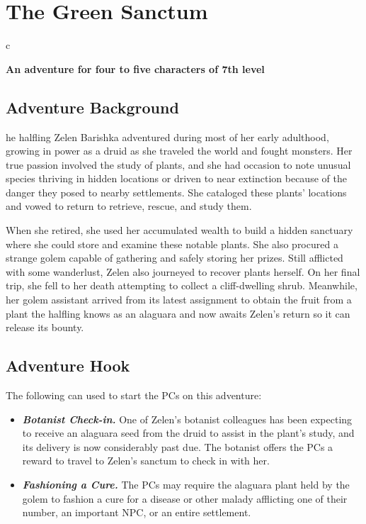 \documentclass[10pt,a4paper,twoside,bg=print,twocolumn,openany,nodeprecatedcode]{dndbook}
\begin{document}
\chapter{The Green Sanctum}

\begin{DndTable}{c}

\textbf{An adventure for four to five characters of 7th level}\\
\end{DndTable}

\section{Adventure Background}
he halfling Zelen Barishka adventured during most of her early adulthood, growing in power as a druid as she traveled the world and fought monsters. Her true passion involved the study of plants, and she had occasion to note unusual species thriving in hidden locations or driven to near extinction because of the danger they posed to nearby settlements. She cataloged these plants' locations and vowed to return to retrieve, rescue, and study them.


When she retired, she used her accumulated wealth to build a hidden sanctuary where she could store and examine these notable plants. She also procured a strange golem capable of gathering and safely storing her prizes. Still afflicted with some wanderlust, Zelen also journeyed to recover plants herself. On her final trip, she fell to her death attempting to collect a cliff-dwelling shrub. Meanwhile, her golem assistant arrived from its latest assignment to obtain the fruit from a plant the halfling knows as an alaguara and now awaits Zelen's return so it can release its bounty.

\section{Adventure Hook}
The following can used to start the PCs on this adventure:


\begin{itemize}
\item \textbf{\textit{Botanist Check-in.}} One of Zelen's botanist colleagues has been expecting to receive an alaguara seed from the druid to assist in the plant's study, and its delivery is now considerably past due. The botanist offers the PCs a reward to travel to Zelen's sanctum to check in with her.
\item \textbf{\textit{Fashioning a Cure.}} The PCs may require the alaguara plant held by the golem to fashion a cure for a disease or other malady afflicting one of their number, an important NPC, or an entire settlement.
\end{itemize}
\end{document}
